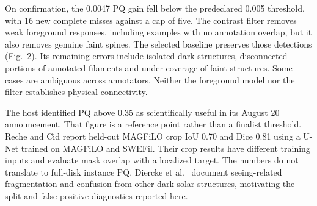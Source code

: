 On confirmation, the 0.0047 PQ gain fell below the predeclared 0.005 threshold, with 16 new complete misses against a cap of five. The contrast filter removes weak foreground responses, including examples with no annotation overlap, but it also removes genuine faint spines. The selected baseline preserves those detections (Fig.~2). Its remaining errors include isolated dark structures, disconnected portions of annotated filaments and under-coverage of faint structures. Some cases are ambiguous across annotators. Neither the foreground model nor the filter establishes physical connectivity.

The host identified PQ above 0.35 as scientifically useful in its August 20 announcement. That figure is a reference point rather than a finalist threshold. Reche and Cid \cite{reche2026} report held-out MAGFiLO crop IoU 0.70 and Dice 0.81 using a U-Net trained on MAGFiLO and SWEFil. Their crop results have different training inputs and evaluate mask overlap with a localized target. The numbers do not translate to full-disk instance PQ. Diercke et al.\ \cite{diercke2024} document seeing-related fragmentation and confusion from other dark solar structures, motivating the split and false-positive diagnostics reported here.
